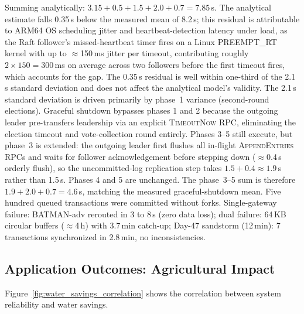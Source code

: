 \documentclass[pdflatex,sn-mathphys-num]{sn-jnl}
\theoremstyle{thmstyleone}
\theoremstyle{thmstyletwo}
\theoremstyle{thmstylethree}
\begin{document}
Summing analytically: $3.15 + 0.5 + 1.5 + 2.0 + 0.7 = 7.85$\,s. The analytical estimate falls 0.35\,s below the measured mean of 8.2\,s; this residual is attributable to ARM64 OS scheduling jitter and heartbeat-detection latency under load, as the Raft follower's missed-heartbeat timer fires on a Linux PREEMPT\_RT kernel with up to $\approx$150\,ms jitter per timeout, contributing roughly $2 \times 150 = 300$\,ms on average across two followers before the first timeout fires, which accounts for the gap. The 0.35\,s residual is well within one-third of the 2.1\,s standard deviation and does not affect the analytical model's validity. The 2.1\,s standard deviation is driven primarily by phase~1 variance (second-round elections). Graceful shutdown bypasses phases 1 and 2 because the outgoing leader pre-transfers leadership via an explicit \textsc{TimeoutNow} RPC, eliminating the election timeout and vote-collection round entirely. Phases 3–5 still execute, but phase~3 is extended: the outgoing leader first flushes all in-flight \textsc{AppendEntries} RPCs and waits for follower acknowledgement before stepping down ($\approx$0.4\,s orderly flush), so the uncommitted-log replication step takes $1.5 + 0.4 \approx 1.9$\,s rather than 1.5\,s. Phases 4 and 5 are unchanged. The phase~3–5 sum is therefore $1.9 + 2.0 + 0.7 = 4.6$\,s, matching the measured graceful-shutdown mean. Five hundred queued transactions were committed without forks. Single-gateway failure: BATMAN-adv rerouted in 3 to 8\,s (zero data loss); dual failure: 64\,KB circular buffers ($\approx$4\,h) with 3.7\,min catch-up; Day-47 sandstorm (12\,min): 7 transactions synchronized in 2.8\,min, no inconsistencies.

\subsection{Application Outcomes: Agricultural Impact}
\label{subsec:agricultural_impact}

Figure~\ref{fig:water_savings_correlation} shows the correlation between system reliability and water savings.
\end{document}

